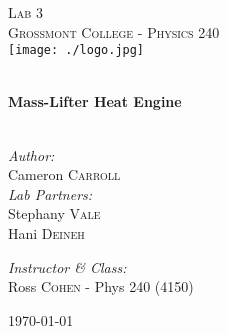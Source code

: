 \begin{titlepage}
\begin{center}

\textsc{\Large Lab 3}\\[1.5cm]
\textsc{\Large Grossmont College - Physics 240}\\[0.5cm]
\texttt{[image: ./logo.jpg]}

\HRule \\[0.4cm]
{ \LARGE \bfseries Mass-Lifter Heat Engine}\\[0.5cm]

\HRule \\[1.5cm]

\begin{minipage}{0.4\textwidth}
\begin{flushleft} \large
\emph{Author:}\\
Cameron \textsc{Carroll}\\[0.2cm]
\emph{Lab Partners:}\\
Stephany  \textsc{Vale}\\
Hani \textsc{Deineh}\\

\end{flushleft}
\end{minipage}
\begin{minipage}{0.4\textwidth}
\begin{flushright} \large
\emph{Instructor \& Class:}\\
Ross \textsc{Cohen} - Phys 240 (4150)
\end{flushright}
\end{minipage}

\vfill

{\large \today}

\end{center}
\end{titlepage}
